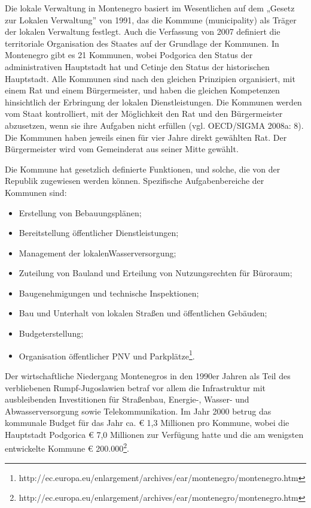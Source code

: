 Die lokale Verwaltung in Montenegro basiert im Wesentlichen auf dem „Gesetz zur Lokalen Verwaltung” von 1991, das die Kommune (municipality) als Träger der lokalen Verwaltung festlegt. Auch die Verfassung von 2007 definiert die territoriale Organisation des Staates auf der Grundlage der Kommunen. In Montenegro gibt es 21 Kommunen, wobei Podgorica den Status der administrativen Hauptstadt hat und Cetinje den Status der historischen Hauptstadt. Alle Kommunen sind nach den gleichen Prinzipien organisiert, mit einem Rat und einem Bürgermeister, und haben die gleichen Kompetenzen hinsichtlich der Erbringung der lokalen Dienstleistungen. Die Kommunen werden vom Staat kontrolliert, mit der Möglichkeit den Rat und den Bürgermeister abzusetzen, wenn sie ihre Aufgaben nicht erfüllen (vgl. OECD/SIGMA 2008a: 8). Die Kommunen haben jeweils einen für vier Jahre direkt gewählten Rat. Der Bürgermeister wird vom Gemeinderat aus seiner Mitte gewählt.\par
Die Kommune hat gesetzlich definierte Funktionen, und solche, die von der Republik zugewiesen werden können. Spezifische Aufgabenbereiche der Kommunen sind:
\begin{itemize}
\item Erstellung von Bebauungsplänen;
\item Bereitstellung öffentlicher Dienstleistungen;
\item Management der lokalenWasserversorgung;
\item Zuteilung von Bauland und Erteilung von Nutzungsrechten für Büroraum;
\item Baugenehmigungen und technische Inspektionen;
\item Bau und Unterhalt von lokalen Straßen und öffentlichen Gebäuden;
\item Budgeterstellung;
\item Organisation öffentlicher PNV und Parkplätze\footnote{http://ec.europa.eu/enlargement/archives/ear/montenegro/montenegro.htm}. 
\end{itemize}
Der wirtschaftliche Niedergang Montenegros in den 1990er Jahren als Teil des verbliebenen Rumpf-Jugoslawien betraf vor allem die Infrastruktur mit ausbleibenden Investitionen für Straßenbau, Energie-, Wasser- und Abwasserversorgung sowie Telekommunikation. Im Jahr 2000 betrug das kommunale Budget für das Jahr ca.  \euro{}  1,3 Millionen pro Kommune, wobei die Hauptstadt Podgorica  \euro{}  7,0 Millionen zur Verfügung hatte und die am wenigsten entwickelte Kommune  \euro{} 200.000\footnote{http://ec.europa.eu/enlargement/archives/ear/montenegro/montenegro.htm}.\par
